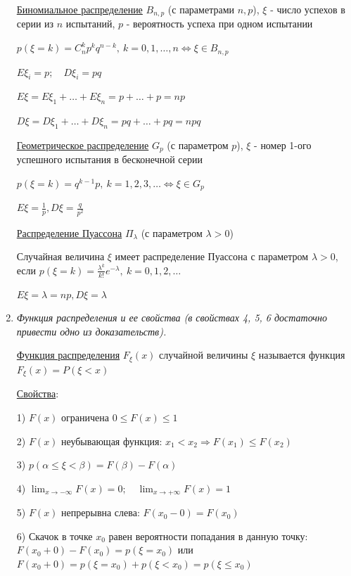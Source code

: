 \documentclass[12pt]{article}
\begin{document}
\begin{enumerate}
    \hyperlink{binomialdistributionproperties}{Биномиальное распределение} $B_{n,p}$ (с параметрами $n, p$),
    $\xi$ - число успехов в серии из $n$ испытаний, $p$ - вероятность успеха при одном испытании

    $p(\xi = k) = C^k_n p^k q^{n - k}, \ k = 0, 1, \dots, n \Longleftrightarrow \xi \in B_{n,p}$

    $E\xi_i = p; \quad D\xi_i = pq$

    $E\xi = E\xi_1 + \dots + E\xi_n = p + \dots + p = np$

    $D\xi = D\xi_1 + \dots + D\xi_n = pq + \dots + pq = npq$

    \hyperlink{geometricdistributionproperties}{Геометрическое распределение} $G_p$ (с параметром $p$),
    $\xi$ - номер 1-ого успешного испытания в бесконечной серии

    $p(\xi = k) = q^{k - 1}p, \ k = 1, 2, 3, \dots \Longleftrightarrow \xi \in G_p$

    $E\xi = \frac{1}{p}, D\xi  = \frac{q}{p^2}$

    \hyperlink{poissondistribution}{Распределение Пуассона} $\Pi_\lambda$ (с параметром $\lambda > 0$)

    Случайная величина $\xi$ имеет распределение Пуассона с параметром $\lambda > 0$, если $p(\xi = k) = \frac{\lambda^k}{k!}e^{-\lambda}, \ k = 0, 1, 2, \dots$

    $E\xi = \lambda = np, D\xi = \lambda$


    \item \textit{Функция распределения и ее свойства (в свойствах 4, 5, 6 достаточно привести одно из доказательств).}
    
    \hyperlink{distributionfunction}{Функция распределения} $F_\xi(x)$ случайной величины $\xi$ называется функция $F_\xi(x) = P(\xi < x)$

    \hyperlink{distributionfunctionproperties}{Свойства}: 

    1) $F(x)$ ограничена $0 \leq F(x) \leq 1$

    2) $F(x)$ неубывающая функция: $x_1 < x_2 \Longrightarrow F(x_1) \leq F(x_2)$ 

    3) $p(\alpha \leq \xi < \beta) = F(\beta) - F(\alpha)$

    4) $\lim_{x \to -\infty} F(x) = 0; \quad \lim_{x \to +\infty} F(x) = 1$
    
    5) $F(x)$ непрерывна слева: $F(x_0 - 0) = F(x_0)$

    6) Скачок в точке $x_0$ равен вероятности попадания в данную точку: $F(x_0 + 0) - F(x_0) = p(\xi = x_0)$ или $F(x_0 + 0) = p(\xi = x_0) + p(\xi < x_0) = p(\xi \leq x_0)$


\end{enumerate}
\end{document}
